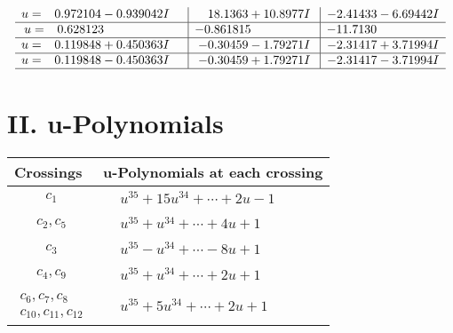 \documentclass[1p]{elsarticle_modified}
\theoremstyle{definition}
\begin{document}
$$\begin{array}{c|c|c}
\begin{aligned}
u &= \phantom{-}0.972104 - 0.939042 I\end{aligned}
 & \phantom{-}18.1363 + 10.8977 I & -2.41433 - 6.69442 I \\ \hline\begin{aligned}
u &= \phantom{-}0.628123\phantom{ +0.000000I}\end{aligned}
 & -0.861815\phantom{ +0.000000I} & -11.7130\phantom{ +0.000000I} \\ \hline\begin{aligned}
u &= \phantom{-}0.119848 + 0.450363 I\end{aligned}
 & -0.30459 - 1.79271 I & -2.31417 + 3.71994 I \\ \hline\begin{aligned}
u &= \phantom{-}0.119848 - 0.450363 I\end{aligned}
 & -0.30459 + 1.79271 I & -2.31417 - 3.71994 I\\
 \hline 
 \end{array}$$\newpage
\newpage\renewcommand{\arraystretch}{1}
\centering \section*{ II. u-Polynomials}
\begin{tabular}{m{50pt}|m{274pt}}
Crossings & \hspace{64pt}u-Polynomials at each crossing \\
\hline $$\begin{aligned}c_{1}\end{aligned}$$&$\begin{aligned}
&u^{35}+15 u^{34}+\cdots+2 u-1
\end{aligned}$\\
\hline $$\begin{aligned}c_{2},c_{5}\end{aligned}$$&$\begin{aligned}
&u^{35}+u^{34}+\cdots+4 u+1
\end{aligned}$\\
\hline $$\begin{aligned}c_{3}\end{aligned}$$&$\begin{aligned}
&u^{35}- u^{34}+\cdots-8 u+1
\end{aligned}$\\
\hline $$\begin{aligned}c_{4},c_{9}\end{aligned}$$&$\begin{aligned}
&u^{35}+u^{34}+\cdots+2 u+1
\end{aligned}$\\
\hline $$\begin{aligned}c_{6},c_{7},c_{8}\\c_{10},c_{11},c_{12}\end{aligned}$$&$\begin{aligned}
&u^{35}+5 u^{34}+\cdots+2 u+1
\end{aligned}$\\
\hline
\end{tabular}\newpage\renewcommand{\arraystretch}{1}
\end{document}

